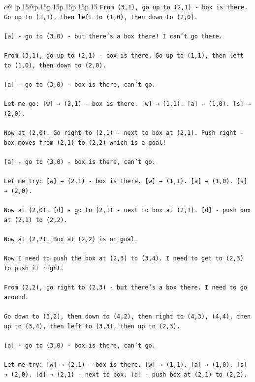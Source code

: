 \documentclass{article}
\begin{document}
{\begin{supertabular}{c@{$\;$}|p{.15\linewidth}@{}p{.15\linewidth}p{.15\linewidth}p{.15\linewidth}p{.15\linewidth}p{.15\linewidth}}
{{{\texttt{From (3,1), go up to (2,1) {-} box is there. Go up to (1,1), then left to (1,0), then down to (2,0).} \\
\\ 
\texttt{{[}a{]} {-} go to (3,0) {-} but there's a box there! I can't go there.} \\
\\ 
\texttt{From (3,1), go up to (2,1) {-} box is there. Go up to (1,1), then left to (1,0), then down to (2,0).} \\
\\ 
\texttt{{[}a{]} {-} go to (3,0) {-} box is there, can't go.} \\
\\ 
\texttt{Let me go: {[}w{]} → (2,1) {-} box is there. {[}w{]} → (1,1). {[}a{]} → (1,0). {[}s{]} → (2,0).} \\
\\ 
\texttt{Now at (2,0). Go right to (2,1) {-} next to box at (2,1). Push right {-} box moves from (2,1) to (2,2) which is a goal!} \\
\\ 
\texttt{{[}a{]} {-} go to (3,0) {-} box is there, can't go.} \\
\\ 
\texttt{Let me try: {[}w{]} → (2,1) {-} box is there. {[}w{]} → (1,1). {[}a{]} → (1,0). {[}s{]} → (2,0).} \\
\\ 
\texttt{Now at (2,0). {[}d{]} {-} go to (2,1) {-} next to box at (2,1). {[}d{]} {-} push box at (2,1) to (2,2).} \\
\\ 
\texttt{Now at (2,2). Box at (2,2) is on goal.} \\
\\ 
\texttt{Now I need to push the box at (2,3) to (3,4). I need to get to (2,3) to push it right.} \\
\\ 
\texttt{From (2,2), go right to (2,3) {-} but there's a box there. I need to go around.} \\
\\ 
\texttt{Go down to (3,2), then down to (4,2), then right to (4,3), (4,4), then up to (3,4), then left to (3,3), then up to (2,3).} \\
\\ 
\texttt{{[}a{]} {-} go to (3,0) {-} box is there, can't go.} \\
\\ 
\texttt{Let me try: {[}w{]} → (2,1) {-} box is there. {[}w{]} → (1,1). {[}a{]} → (1,0). {[}s{]} → (2,0). {[}d{]} → (2,1) {-} next to box. {[}d{]} {-} push box at (2,1) to (2,2).} \\
}}}
\end{supertabular}}
\end{document}
